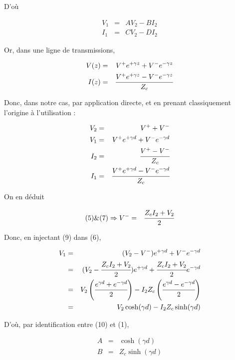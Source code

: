 \documentclass[10pt]{article}
\begin{document}
\begin{itemize}
        D'où

        \begin{eqnarray}
            V_1 &=& A V_2 - B I_2 \\
            I_1 &=& C V_2 - D I_2
        \end{eqnarray}

        Or, dans une ligne de transmissions, 

        \begin{eqnarray}
            V(z) &=& V^+ e^{+\gamma z} +V^- e^{-\gamma z} \\
            I(z) &=& \cfrac{V^+ e^{+\gamma z} -V^- e^{-\gamma z}}{Z_c}
        \end{eqnarray}

        Donc, dans notre cas, par application directe, et en prenant classiquement l'origine à l'utilisation :

        \begin{eqnarray}
            V_2 &=& V^+ + V^- \\
            V_1 &=& V^+ e^{+\gamma d} +V^- e^{-\gamma d} \\
            I_2 &=& \cfrac{V^+ -V^- }{Z_c}\\
            I_1 &=& \cfrac{V^+ e^{+\gamma d} -V^- e^{-\gamma d}}{Z_c}
        \end{eqnarray}

        On en déduit

        \begin{eqnarray}
            (5) \& (7) \Rightarrow V^- &=& \cfrac{Z_c I_2 + V_2}{2}
        \end{eqnarray}

        Donc, en injectant (9) dans (6),

        \begin{eqnarray}
            V_1 &=& (V_2 - V^-) e^{+\gamma d} + V^- e^{-\gamma d} \nonumber \\
            &=& (V_2 - \cfrac{Z_c I_2 + V_2}{2}) e^{+\gamma d} + \cfrac{Z_c I_2 + V_2}{2} e^{-\gamma d} \nonumber \\
            &=& V_2 \left(\cfrac{e^{\gamma d} + e^{-\gamma d}}{2}\right) - I_2 Z_c \left(\cfrac{e^{\gamma d} - e^{-\gamma d}}{2}\right) \nonumber \\
            &=& V_2 \cosh(\gamma d) - I_2 Z_c \sinh(\gamma d)
        \end{eqnarray}

        D'où, par identification entre (10) et (1),

        \begin{eqnarray}
            A &=& \cosh(\gamma d) \\
            B &=& Z_c \sinh(\gamma d)
        \end{eqnarray}


\end{itemize}
\end{document}
